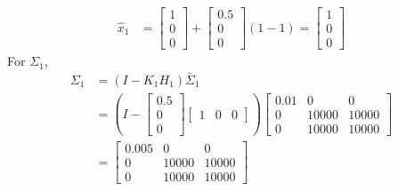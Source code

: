 \documentclass[answers]{exam}
\begin{document}
\begin{questions}
\begin{parts}
\begin{solution}
            \begin{align*}
                \hat{x}_1 & = \begin{bmatrix}
                                  1 \\ 0 \\ 0
                              \end{bmatrix} + \begin{bmatrix}
                                                  0.5 \\ 0 \\ 0
                                              \end{bmatrix} \left(1 - 1\right)
                = \begin{bmatrix}
                      1 \\ 0 \\ 0
                  \end{bmatrix}
            \end{align*}
            For $\Sigma_1$,
            \begin{align*}
                \Sigma_1 & = \left(I - K_1 H_1\right) \bar{\Sigma}_1                           \\
                         & = \left(I - \begin{bmatrix}
                                               0.5 \\ 0 \\ 0
                                           \end{bmatrix} \begin{bmatrix}
                                                             1 & 0 & 0
                                                         \end{bmatrix}\right) \begin{bmatrix}
                                                                              0.01 & 0     & 0     \\
                                                                              0    & 10000 & 10000 \\
                                                                              0    & 10000 & 10000
                                                                          \end{bmatrix} \\
                         & = \begin{bmatrix}
                                 0.005 & 0     & 0     \\
                                 0     & 10000 & 10000 \\
                                 0     & 10000 & 10000
                             \end{bmatrix}
            \end{align*}


\end{solution}
\end{parts}
\end{questions}
\end{document}
